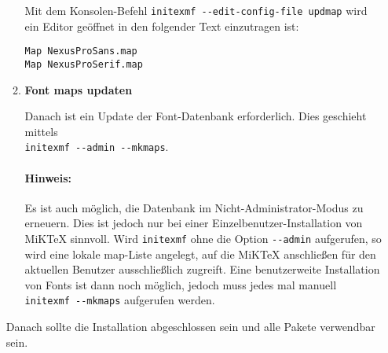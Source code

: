 \documentclass[12pt]{scrartcl}
\begin{document}
\begin{enumerate}
\begin{enumerate}
      Mit dem Konsolen-Befehl \lstinline{initexmf --edit-config-file updmap}
      wird ein Editor geöffnet in den folgender Text einzutragen ist:

      \begin{lstlisting}
Map NexusProSans.map
Map NexusProSerif.map
      \end{lstlisting}

      \item {\bfseries Font maps updaten}

        Danach ist ein Update der Font-Datenbank erforderlich. Dies geschieht
        mittels\\ \lstinline{initexmf --admin --mkmaps}.
        
        \paragraph{Hinweis:} Es ist auch möglich, die Datenbank im 
          Nicht-Administrator-Modus zu erneu\-ern. Dies ist jedoch nur bei einer
          Einzelbenutzer-Installation von MiKTeX sinnvoll. Wird
          \lstinline{initexmf} ohne die Option \lstinline{--admin} aufgerufen,
          so wird eine lokale map-Liste angelegt, auf die MiKTeX anschließen für
          den aktuellen Benutzer ausschließlich zugreift.
          Eine benutzerweite Installation von Fonts ist dann noch 
          möglich, jedoch muss jedes mal manuell \lstinline{initexmf --mkmaps}
          aufgerufen werden.
    \end{enumerate}
    
    Danach sollte die Installation abgeschlossen sein und alle Pakete verwendbar 
    sein.
\end{enumerate}
\end{document}
